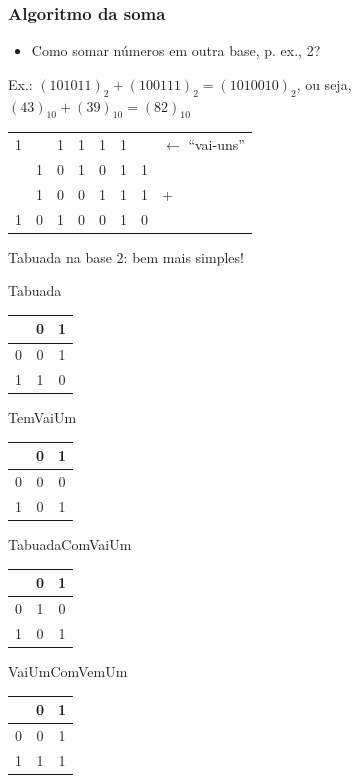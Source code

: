 \documentclass{beamer}
\begin{document}
\begin{frame}
\frametitle{Algoritmo da soma}

\begin{itemize}
 \item Como somar números em outra base, p. ex., 2?
\end{itemize}

Ex.: $(101011)_2 + (100111)_2 = (1010010)_2$, ou seja, $(43)_{10} + (39)_{10}
= (82)_{10}$\\[4pt]

\begin{center}
\begin{tabular}{c@{\,}c@{\,}c@{\,}c@{\,}c@{\,}c@{\,}cl}
 1 &   & 1 & 1 & 1 & 1 &   & $\leftarrow$ ``vai-uns''\\
   & 1 & 0 & 1 & 0 & 1 & 1 & \\
   & 1 & 0 & 0 & 1 & 1 & 1 & + \\
\cline{1-7}
 1 & 0 & 1 & 0 & 0 & 1 & 0 &
\end{tabular}
\end{center}

\pause

Tabuada na base $2$: bem mais simples!\\[6pt]

\pause

\begin{minipage}{0.19\textwidth}
Tabuada

\begin{tabular}{c|cc}
   & 0 & 1 \\
\hline
 0 & 0 & 1 \\
 1 & 1 & 0
\end{tabular}
\end{minipage}
\begin{minipage}{0.19\textwidth}
TemVaiUm

\begin{tabular}{c|cc}
   & 0 & 1 \\
\hline
 0 & 0 & 0 \\
 1 & 0 & 1
\end{tabular}
\end{minipage}
\begin{minipage}{0.29\textwidth}
TabuadaComVaiUm

\begin{tabular}{c|cc}
   & 0 & 1 \\
\hline
 0 & 1 & 0 \\
 1 & 0 & 1
\end{tabular}
\end{minipage}
\begin{minipage}{0.29\textwidth}
VaiUmComVemUm

\begin{tabular}{c|cc}
   & 0 & 1 \\
\hline
 0 & 0 & 1 \\
 1 & 1 & 1
\end{tabular}
\end{minipage}

\end{frame}
\end{document}
